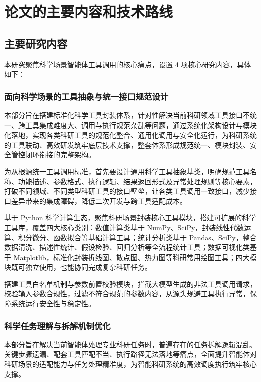 \section{论文的主要内容和技术路线}

\subsection{主要研究内容}

本研究聚焦科学场景智能体工具调用的核心痛点，设置 4 项核心研究内容，具体如下：

\subsubsection{面向科学场景的工具抽象与统一接口规范设计}

本部分旨在搭建标准化科学工具封装体系，针对性解决当前科研领域工具接口不统一、跨工具集成难度大、调用与执行规范杂乱等问题，通过系统化架构设计与模块化落地，实现各类科研工具的规范化整合、通用化调用与安全化运行，为科研系统的工具联动、高效研发筑牢底层技术支撑，整套体系形成规范统一、模块封装、安全管控闭环衔接的完整架构。

为从根源统一工具调用标准，首先要设计通用科学工具抽象基类，明确规范工具名称、功能描述、参数格式、执行逻辑、结果返回形式及异常处理规则等核心要素，打破不同领域、不同类型科研工具的接口壁垒，让各类工具调用一致接口，减少接口差异带来的集成障碍，降低二次开发与跨工具适配成本\cite{schick2023toolformer,langchain2023}。

基于 Python 科学计算生态，聚焦科研场景封装核心工具模块，搭建可扩展的科学工具库，覆盖四大核心类别：数值计算类基于 NumPy、SciPy\cite{harris2020numpy,virtanen2020scipy}，封装线性代数运算、积分微分、函数拟合等基础计算工具；统计分析类基于 Pandas、SciPy\cite{harris2020numpy,mckinney2010pandas}，整合数据清洗、描述性统计、假设检验、回归分析等全流程统计工具；数据可视化类基于 Matplotlib，标准化封装折线图、散点图、热力图等科研常用绘图工具；四大模块既可独立使用，也能协同完成复杂科研任务。

搭建工具白名单机制与参数前置校验模块，拦截大模型生成的非法工具调用请求，校验输入参数合规性，过滤不符合规范的参数内容，从源头规避工具执行异常，保障系统运行安全性与稳定性。

\subsubsection{科学任务理解与拆解机制优化}

本部分旨在解决当前智能体处理专业科研任务时，普遍存在的任务拆解逻辑混乱、关键步骤遗漏、配套工具匹配不当、执行路径无法落地等痛点，全面提升智能体对科研场景的适配能力与任务处理精准度，为智能科研系统的高效调度执行筑牢核心支撑\cite{yao2023react,wang2023plansolve}。

